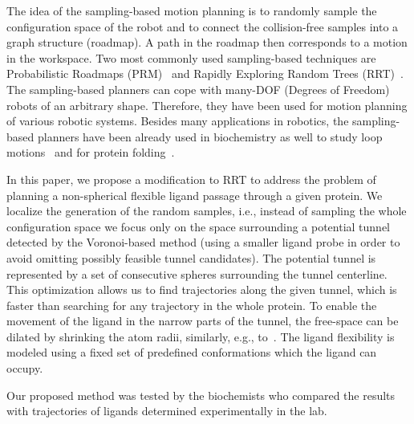 \documentclass[usletter, 10pt, conference]{ieeeconf} %
\begin{document}
The idea of the sampling-based motion planning is to randomly sample the configuration space of the robot and to connect the collision-free samples
into a graph structure (roadmap).
A path in the roadmap then corresponds to a motion in the workspace.
Two most commonly used sampling-based techniques are Probabilistic Roadmaps (PRM)~\cite{kavrakiForPP} and Rapidly Exploring Random Trees (RRT)~\cite{lavalleRRT}.
The sampling-based planners can cope with many-DOF (Degrees of Freedom) robots of an arbitrary shape.
Therefore, they have been used for motion planning of various robotic systems.
Besides many applications in robotics, the sampling-based planners have been already used in biochemistry as well 
to study loop motions~\cite{cortes2004geometric}
and for protein folding~\cite{raveh2009rapid,novinskaya2015improving}.

In this paper, we propose a modification to RRT to address the problem of planning a non-spherical flexible ligand passage through a given protein.
We localize the generation of the random samples, i.e., instead of sampling the whole configuration space we focus only on the space surrounding a potential tunnel detected by the Voronoi-based method (using a smaller ligand probe in order to avoid omitting possibly feasible tunnel candidates).
The potential tunnel is represented by a set of consecutive spheres surrounding the tunnel centerline.
This optimization allows us to find trajectories along the given tunnel, which is faster than searching for any trajectory in the whole protein.
To enable the movement of the ligand in the narrow parts of the tunnel, the free-space can be dilated by shrinking the atom radii, similarly, e.g., to~\cite{cortes2005path,hsu06multilevel}. 
The ligand flexibility is modeled using a fixed set of predefined conformations which the ligand can occupy.

Our proposed method was tested by the biochemists who compared the results with trajectories of ligands determined experimentally in the lab.
\end{document}
